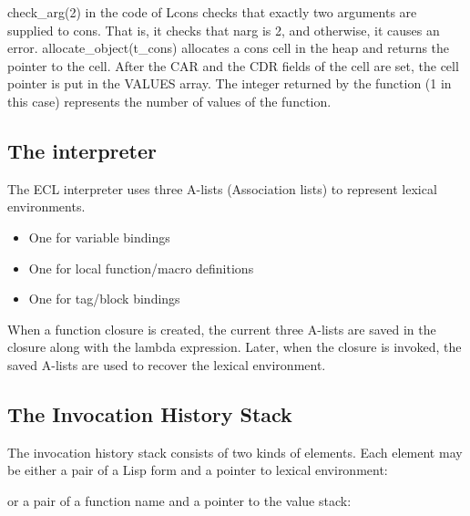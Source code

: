 {\code check\_arg(2)} in the code of {\code Lcons} checks that exactly
two arguments are supplied to {\code cons}.  That is, it checks that
{\code narg} is 2, and otherwise, it causes an error.  {\code
  allocate\_object(t\_cons)} allocates a cons cell in the heap and
returns the pointer to the cell.  After the {\code CAR} and the {\code
  CDR} fields of the cell are set, the cell pointer is put in the
{\code VALUES} array. The integer returned by the function (1 in this
case) represents the number of values of the function.

\subsection{The interpreter}

The ECL interpreter uses three A-lists (Association lists) to
represent lexical environments.

\begin{itemize}
\item One for variable bindings
\item One for local function/macro definitions
\item One for tag/block bindings
\end{itemize}

When a function closure is created, the current three A-lists are
saved in the closure along with the lambda expression.  Later, when the
closure is invoked, the saved A-lists are
used to recover the lexical environment.

\subsection{The Invocation History Stack}
 
The invocation history stack consists of two kinds of elements.  Each element
may be either a pair of a Lisp form and a pointer to lexical environment:

\vspace{1 em}

\centerline{}

\vspace{1 em}
 
or a pair of a function name and a pointer to the value stack:

\vspace{1 em}


